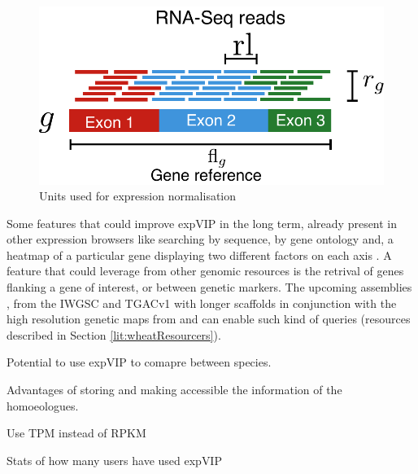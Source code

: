 \begin{figure}
\includegraphics[width=1\textwidth]{expVIP/Figures/Units.pdf}
\caption[Units used for expression normalisation]{Units used for expression normalisation}
\label{fig:exp:units}
\end{figure}

Some features that could improve expVIP in the long term, already present in other expression browsers like searching by sequence, by gene ontology and, a heatmap of a particular gene displaying two different factors on each axis . 
A feature that could leverage from other genomic resources is the retrival of genes flanking a gene of interest, or between genetic markers. 
The upcoming assemblies , from the IWGSC \citep{Clark2016} and TGACv1 \citep{Pozniak2016}  with longer scaffolds in conjunction with the high resolution genetic maps from \citet{Wang2014} and \citet{Chapman2015} can enable such kind of queries (resources described in Section \ref{lit:wheatResourcers}). 

Potential to use expVIP to comapre between species. 


Advantages of storing and making accessible the information of the homoeologues. 

Use TPM instead of RPKM

Stats of how many users have used expVIP



